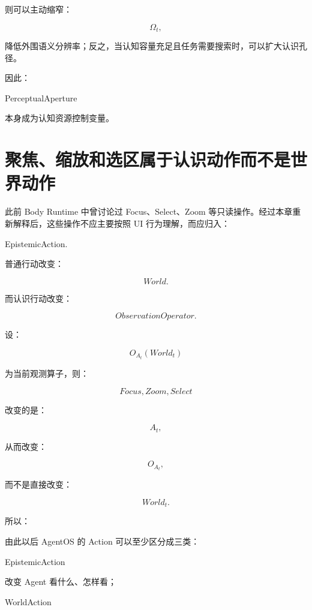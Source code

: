 则可以主动缩窄：

\[
\Omega_t,
\]

降低外围语义分辨率；反之，当认知容量充足且任务需要搜索时，可以扩大认识孔径。

因此：

\begin{statementbox}
PerceptualAperture
\end{statementbox}

本身成为认知资源控制变量。

\section{聚焦、缩放和选区属于认识动作而不是世界动作}

此前 Body Runtime 中曾讨论过 Focus、Select、Zoom 等只读操作。经过本章重新解释后，这些操作不应主要按照 UI 行为理解，而应归入：

\begin{statementbox}
EpistemicAction.
\end{statementbox}

普通行动改变：

\[
World.
\]

而认识行动改变：

\[
ObservationOperator.
\]

设：

\[
O_{A_t}(World_t)
\]

为当前观测算子，则：

\[
Focus,
Zoom,
Select
\]

改变的是：

\[
A_t,
\]

从而改变：

\[
O_{A_t},
\]

而不是直接改变：

\[
World_t.
\]

所以：

\begin{statementbox}
\centering
{}
\end{statementbox}

由此以后 AgentOS 的 Action 可以至少区分成三类：

\begin{statementbox}
EpistemicAction
\end{statementbox}

改变 Agent 看什么、怎样看；

\begin{statementbox}
WorldAction
\end{statementbox}

